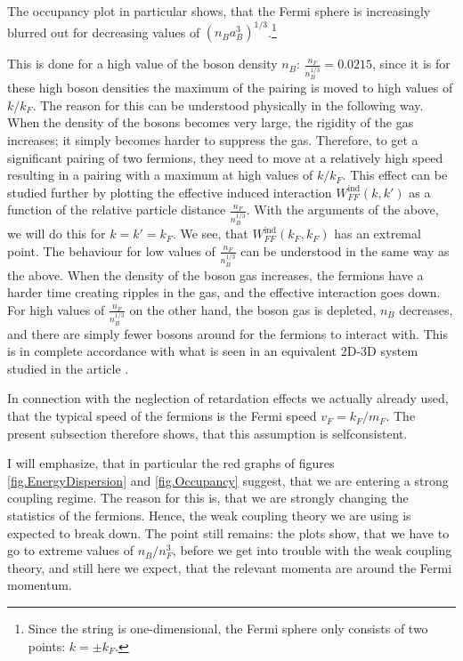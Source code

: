 The occupancy plot in particular shows, that the Fermi sphere is increasingly blurred out for decreasing values of $(n_Ba_B^3)^{1/3}$.\footnote{Since the string is one-dimensional, the Fermi sphere only consists of two points: $k = \pm k_F$.} 

This is done for a high value of the boson density $n_B$: $\frac{n_F}{n_B^{1/3}} = 0.0215$, since it is for these high boson densities the maximum of the pairing is moved to high values of $k/k_F$. The reason for this can be understood physically in the following way. When the density of the bosons becomes very large, the rigidity of the gas increases; it simply becomes harder to suppress the gas. Therefore, to get a significant pairing of two fermions, they need to move at a relatively high speed resulting in a pairing with a maximum at high values of $k/k_F$. This effect can be studied further by plotting the effective induced interaction $W_{FF}^{\text{ind}}(k,k')$ as a function of the relative particle distance $\frac{n_F}{n_B^{1/3}}$. With the arguments of the above, we will do this for $k = k' = k_F$. We see, that $W_{FF}^{\text{ind}}(k_F,k_F)$ has an extremal point. The behaviour for low values of $\frac{n_F}{n_B^{1/3}}$ can be understood in the same way as the above. When the density of the boson gas increases, the fermions have a harder time creating ripples in the gas, and the effective interaction goes down. For high values of $\frac{n_F}{n_B^{1/3}}$ on the other hand, the boson gas is depleted, $n_B$ decreases, and there are simply fewer bosons around for the fermions to interact with. This is in complete accordance with what is seen in an equivalent 2D-3D system studied in the article \cite{BruunZhigangTopSuperfluid}. 

In connection with the neglection of retardation effects we actually already used, that the typical speed of the fermions is the Fermi speed $v_F = k_F/m_F$. The present subsection therefore shows, that this assumption is selfconsistent. 

I will emphasize, that in particular the red graphs of figures \ref{fig.EnergyDispersion} and \ref{fig.Occupancy} suggest, that we are entering a strong coupling regime. The reason for this is, that we are strongly changing the statistics of the fermions. Hence, the weak coupling theory we are using is expected to break down. The point still remains: the plots show, that we have to go to extreme values of $n_B/n_F^3$, before we get into trouble with the weak coupling theory, and still here we expect, that the relevant momenta are around the Fermi momentum. 


